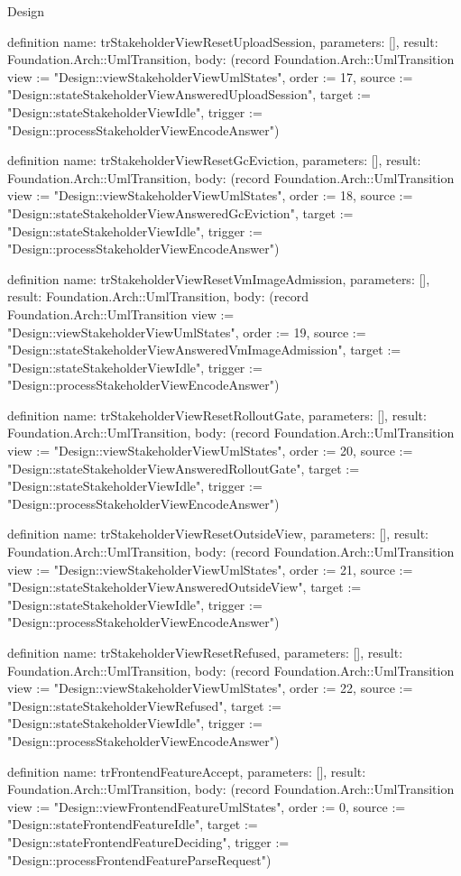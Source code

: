 \begin{lexlean}{Design}
\begin{semanticmodule}
definition{
  name: trStakeholderViewResetUploadSession,
  parameters: [],
  result: Foundation.Arch::UmlTransition,
  body: (record Foundation.Arch::UmlTransition {view := "Design::viewStakeholderViewUmlStates", order := 17, source := "Design::stateStakeholderViewAnsweredUploadSession", target := "Design::stateStakeholderViewIdle", trigger := "Design::processStakeholderViewEncodeAnswer"})
}

definition{
  name: trStakeholderViewResetGcEviction,
  parameters: [],
  result: Foundation.Arch::UmlTransition,
  body: (record Foundation.Arch::UmlTransition {view := "Design::viewStakeholderViewUmlStates", order := 18, source := "Design::stateStakeholderViewAnsweredGcEviction", target := "Design::stateStakeholderViewIdle", trigger := "Design::processStakeholderViewEncodeAnswer"})
}

definition{
  name: trStakeholderViewResetVmImageAdmission,
  parameters: [],
  result: Foundation.Arch::UmlTransition,
  body: (record Foundation.Arch::UmlTransition {view := "Design::viewStakeholderViewUmlStates", order := 19, source := "Design::stateStakeholderViewAnsweredVmImageAdmission", target := "Design::stateStakeholderViewIdle", trigger := "Design::processStakeholderViewEncodeAnswer"})
}

definition{
  name: trStakeholderViewResetRolloutGate,
  parameters: [],
  result: Foundation.Arch::UmlTransition,
  body: (record Foundation.Arch::UmlTransition {view := "Design::viewStakeholderViewUmlStates", order := 20, source := "Design::stateStakeholderViewAnsweredRolloutGate", target := "Design::stateStakeholderViewIdle", trigger := "Design::processStakeholderViewEncodeAnswer"})
}

definition{
  name: trStakeholderViewResetOutsideView,
  parameters: [],
  result: Foundation.Arch::UmlTransition,
  body: (record Foundation.Arch::UmlTransition {view := "Design::viewStakeholderViewUmlStates", order := 21, source := "Design::stateStakeholderViewAnsweredOutsideView", target := "Design::stateStakeholderViewIdle", trigger := "Design::processStakeholderViewEncodeAnswer"})
}

definition{
  name: trStakeholderViewResetRefused,
  parameters: [],
  result: Foundation.Arch::UmlTransition,
  body: (record Foundation.Arch::UmlTransition {view := "Design::viewStakeholderViewUmlStates", order := 22, source := "Design::stateStakeholderViewRefused", target := "Design::stateStakeholderViewIdle", trigger := "Design::processStakeholderViewEncodeAnswer"})
}

definition{
  name: trFrontendFeatureAccept,
  parameters: [],
  result: Foundation.Arch::UmlTransition,
  body: (record Foundation.Arch::UmlTransition {view := "Design::viewFrontendFeatureUmlStates", order := 0, source := "Design::stateFrontendFeatureIdle", target := "Design::stateFrontendFeatureDeciding", trigger := "Design::processFrontendFeatureParseRequest"})
}


\end{semanticmodule}
\end{lexlean}
